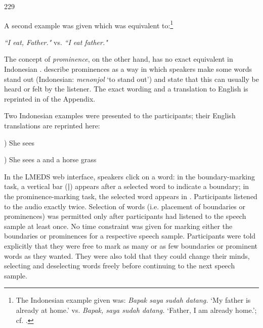 \begin{center}
	229  
\end{center}

A second example was given which was equivalent to:\footnote{The Indonesian example given was: \textit{Bapak saya sudah datang.} `My father is already at home.' vs. \textit{Bapak, saya sudah datang.} `Father, I am already home.'; cf. \citet[409--412]{riesberg2018perception}.}


\begin{center}
	\textit{``I eat, Father."} \quad vs. \quad \textit{``I eat father."}
\end{center}

The concept of \textit{prominence}, on the other hand, has no exact equivalent in Indonesian  \citep[compare also ][29]{Cole2016}.  \citet[409]{riesberg2018perception} describe prominences  as a way in which speakers make some words stand  out (Indonesian: \textit{menonjol} `to stand out') and state that this can usually be heard or felt by the listener. The exact wording and a translation to English is reprinted in    of the Appendix. 


 Two Indonesian examples were presented to the participants; their English translations are reprinted here:

\bigskip

\quad \quad \quad \quad \quad {}) She sees   

\medskip


\quad \quad \quad \quad \quad {}) She sees a  and a horse   grass

\bigskip






In the LMEDS  web interface, speakers click on a word: in the boundary-marking task, a vertical bar  (\textbf{|})  appears after a selected word to indicate a boundary; in the prominence-marking task, the selected word appears in .
Participants listened to the audio exactly twice. Selection of words (i.e. placement of boundaries or prominences) was permitted only after participants had listened to the speech sample at least once. No time constraint was given for marking either the boundaries or prominences for a respective speech sample. Participants were told explicitly that they were free to mark as many or as few boundaries or prominent words as they wanted. They were also told that they could change their minds, selecting and deselecting words freely before continuing to the next speech sample.

